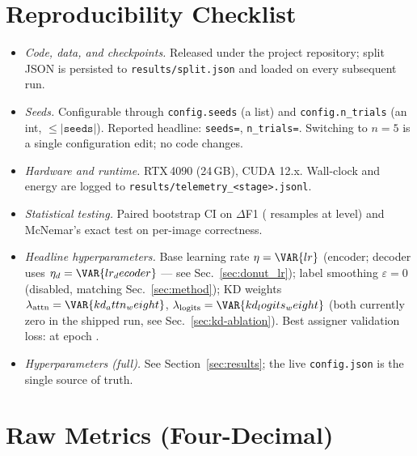 \appendices

\section{Reproducibility Checklist}
\label{app:repro}

\begin{itemize}
  \item \emph{Code, data, and checkpoints.}  Released under the
        project repository; split JSON is persisted to
        \texttt{results/split.json} and loaded on every subsequent run.
  \item \emph{Seeds.}  Configurable through \texttt{config.seeds} (a
        list) and \texttt{config.n\_trials} (an int,
        $\le|\texttt{seeds}|$).  Reported headline:
        \texttt{seeds=},
        \texttt{n\_trials=}.  Switching to $n{=}5$ is a
        single configuration edit; no code changes.
  \item \emph{Hardware and runtime.}  RTX\,4090 (24\,GB), CUDA 12.x.
        Wall-clock and energy are logged to
        \texttt{results/telemetry\_\textless stage\textgreater.jsonl}.
  \item \emph{Statistical testing.}  Paired bootstrap CI on
        $\Delta$F1 ( resamples at
         level) and McNemar's exact test on
        per-image correctness.
  \item \emph{Headline hyperparameters.}  Base learning rate
        $\eta=\VAR{lr}$ (encoder; decoder uses $\eta_d=\VAR{lr_decoder}$
        --- see Sec.~\ref{sec:donut_lr}); label smoothing
        $\varepsilon=0$ (disabled, matching Sec.~\ref{sec:method});
        KD weights
        $\lambda_\text{attn}=\VAR{kd_attn_weight}$,
        $\lambda_\text{logits}=\VAR{kd_logits_weight}$ (both currently
        zero in the shipped run, see
        Sec.~\ref{sec:kd-ablation}).  Best assigner validation loss:
         at epoch
        .
  \item \emph{Hyperparameters (full).}  See Section~\ref{sec:results};
        the live \texttt{config.json} is the single source of truth.
\end{itemize}


\section{Raw Metrics (Four-Decimal)}
\label{app:raw}


